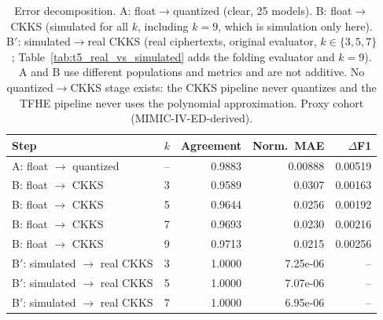 \begin{table}[t]
\centering
\caption{Error decomposition. A: float$\to$quantized (clear, 25 models). B: float$\to$CKKS (simulated for all $k$, including $k=9$, which is simulation only here). B$'$: simulated$\to$real CKKS (real ciphertexts, original evaluator, $k\in\{3,5,7\}$; Table~\ref{tab:t5_real_vs_simulated} adds the folding evaluator and $k=9$). A and B use different populations and metrics and are not additive. No quantized$\to$CKKS stage exists: the CKKS pipeline never quantizes and the TFHE pipeline never uses the polynomial approximation. Proxy cohort (MIMIC-IV-ED-derived).}
\label{tab:t7_error_decomposition}
\begin{tabular}{llrrr}
\toprule
Step & $k$ & Agreement & Norm.\ MAE & $\Delta$F1 \\
\midrule
A: float $\to$ quantized & -- & 0.9883 & 0.00888 & 0.00519 \\
\midrule
B: float $\to$ CKKS & 3 & 0.9589 & 0.0307 & 0.00163 \\
B: float $\to$ CKKS & 5 & 0.9644 & 0.0256 & 0.00192 \\
B: float $\to$ CKKS & 7 & 0.9693 & 0.0230 & 0.00216 \\
B: float $\to$ CKKS & 9 & 0.9713 & 0.0215 & 0.00256 \\
\midrule
B$'$: simulated $\to$ real CKKS & 3 & 1.0000 & 7.25e-06 & -- \\
B$'$: simulated $\to$ real CKKS & 5 & 1.0000 & 7.07e-06 & -- \\
B$'$: simulated $\to$ real CKKS & 7 & 1.0000 & 6.95e-06 & -- \\
\bottomrule
\end{tabular}
\end{table}
